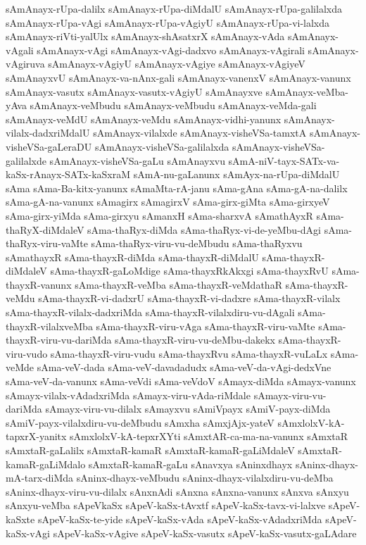 {sAmAnayx-rUpa-dalilx
sAmAnayx-rUpa-diMdalU
sAmAnayx-rUpa-galilalxda
sAmAnayx-rUpa-vAgi
sAmAnayx-rUpa-vAgiyU
sAmAnayx-rUpa-vi-lalxda
sAmAnayx-riVti-yalUlx
sAmAnayx-shAsatxrX
sAmAnayx-vAda
sAmAnayx-vAgali
sAmAnayx-vAgi
sAmAnayx-vAgi-dadxvo
sAmAnayx-vAgirali
sAmAnayx-vAgiruva
sAmAnayx-vAgiyU
sAmAnayx-vAgiye
sAmAnayx-vAgiyeV
sAmAnayxvU
sAmAnayx-va-nAnx-gali
sAmAnayx-vanenxV
sAmAnayx-vanunx
sAmAnayx-vasutx
sAmAnayx-vasutx-vAgiyU
sAmAnayxve
sAmAnayx-veMba-yAva
sAmAnayx-veMbudu
sAmAnayx-veMbudu
sAmAnayx-veMda-gali
sAmAnayx-veMdU
sAmAnayx-veMdu
sAmAnayx-vidhi-yanunx
sAmAnayx-vilalx-dadxriMdalU
sAmAnayx-vilalxde
sAmAnayx-visheVSa-tamxtA
sAmAnayx-visheVSa-gaLeraDU
sAmAnayx-visheVSa-galilalxda
sAmAnayx-visheVSa-galilalxde
sAmAnayx-visheVSa-gaLu
sAmAnayxvu
sAmA-niV-tayx-SATx-va-kaSx-rAnayx-SATx-kaSxraM
sAmA-nu-gaLanunx
sAmAyx-na-rUpa-diMdalU
sAma
sAma-Ba-kitx-yanunx
sAmaMta-rA-janu
sAma-gAna
sAma-gA-na-dalilx
sAma-gA-na-vanunx
sAmagirx
sAmagirxV
sAma-girx-giMta
sAma-girxyeV
sAma-girx-yiMda
sAma-girxyu
sAmanxH
sAma-sharxvA
sAmathAyxR
sAma-thaRyX-diMdaleV
sAma-thaRyx-diMda
sAma-thaRyx-vi-de-yeMbu-dAgi
sAma-thaRyx-viru-vaMte
sAma-thaRyx-viru-vu-deMbudu
sAma-thaRyxvu
sAmathayxR
sAma-thayxR-diMda
sAma-thayxR-diMdalU
sAma-thayxR-diMdaleV
sAma-thayxR-gaLoMdige
sAma-thayxRkAkxgi
sAma-thayxRvU
sAma-thayxR-vanunx
sAma-thayxR-veMba
sAma-thayxR-veMdathaR
sAma-thayxR-veMdu
sAma-thayxR-vi-dadxrU
sAma-thayxR-vi-dadxre
sAma-thayxR-vilalx
sAma-thayxR-vilalx-dadxriMda
sAma-thayxR-vilalxdiru-vu-dAgali
sAma-thayxR-vilalxveMba
sAma-thayxR-viru-vAga
sAma-thayxR-viru-vaMte
sAma-thayxR-viru-vu-dariMda
sAma-thayxR-viru-vu-deMbu-dakekx
sAma-thayxR-viru-vudo
sAma-thayxR-viru-vudu
sAma-thayxRvu
sAma-thayxR-vuLaLx
sAma-veMde
sAma-veV-dada
sAma-veV-davadadudx
sAma-veV-da-vAgi-dedxVne
sAma-veV-da-vanunx
sAma-veVdi
sAma-veVdoV
sAmayx-diMda
sAmayx-vanunx
sAmayx-vilalx-vAdadxriMda
sAmayx-viru-vAda-riMdale
sAmayx-viru-vu-dariMda
sAmayx-viru-vu-dilalx
sAmayxvu
sAmiVpayx
sAmiV-payx-diMda
sAmiV-payx-vilalxdiru-vu-deMbudu
sAmxha
sAmxjAjx-yateV
sAmxlolxV-kA-tapxrX-yanitx
sAmxlolxV-kA-tepxrXYti
sAmxtAR-ca-ma-na-vanunx
sAmxtaR
sAmxtaR-gaLalilx
sAmxtaR-kamaR
sAmxtaR-kamaR-gaLiMdaleV
sAmxtaR-kamaR-gaLiMdalo
sAmxtaR-kamaR-gaLu
sAnavxya
sAninxdhayx
sAninx-dhayx-mA-tarx-diMda
sAninx-dhayx-veMbudu
sAninx-dhayx-vilalxdiru-vu-deMba
sAninx-dhayx-viru-vu-dilalx
sAnxnAdi
sAnxna
sAnxna-vanunx
sAnxva
sAnxyu
sAnxyu-veMba
sApeVkaSx
sApeV-kaSx-tAvxtf
sApeV-kaSx-tavx-vi-lalxve
sApeV-kaSxte
sApeV-kaSx-te-yide
sApeV-kaSx-vAda
sApeV-kaSx-vAdadxriMda
sApeV-kaSx-vAgi
sApeV-kaSx-vAgive
sApeV-kaSx-vasutx
sApeV-kaSx-vasutx-gaLAdare
}
